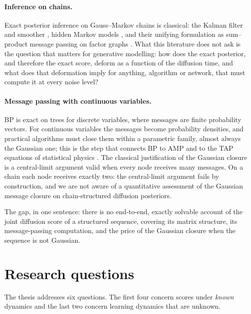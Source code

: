 \paragraph{Inference on chains.} Exact posterior inference on
Gauss--Markov chains is classical: the Kalman filter and smoother
\citep{kalman1960new, rauch1965maximum}, hidden Markov models
\citep{rabiner1989tutorial}, and their unifying formulation as
sum--product message passing on factor graphs
\citep{kschischang2001factor, mezard2009information}. What this
literature does not ask is the question that matters for generative
modelling: how does the exact posterior, and therefore the exact score,
deform as a function of the diffusion time, and what does that
deformation imply for anything, algorithm or network, that must compute
it at every noise level?

\paragraph{Message passing with continuous variables.} BP is exact on
trees for discrete variables, where messages are finite probability
vectors. For continuous variables the messages become probability
densities, and practical algorithms must close them within a parametric
family, almost always the Gaussian one; this is the step that connects
BP to AMP and to the TAP equations of statistical physics
\citep{thouless1977solution, donoho2009message, zdeborova2016statistical,
genovese2026amp}. The classical justification of the Gaussian closure is
a central-limit argument valid when every node receives many messages.
On a chain each node receives exactly two: the central-limit argument
fails by construction, and we are not aware of a quantitative assessment
of the Gaussian message closure on chain-structured diffusion
posteriors.

The gap, in one sentence: there is no end-to-end, exactly solvable
account of the joint diffusion score of a structured sequence, covering
its matrix structure, its message-passing computation, and the price of
the Gaussian closure when the sequence is not Gaussian.

\section{Research questions}\label{sec:rq}

The thesis addresses six questions. The first four concern scores under
\emph{known} dynamics and the last two concern learning dynamics that are
unknown.

